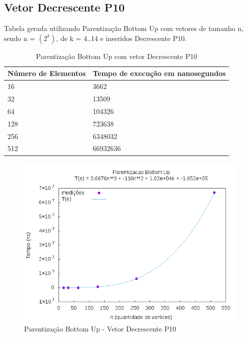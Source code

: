 \documentclass[12pt,a4paper,twoside]{report}
\begin{document}
\subsection{Vetor Decrescente P10}
Tabela gerada utilizando Parentização Bottom Up com vetores de tamanho n, sendo n = $(2^k)$, de k = 4..14 e inseridos Decrescente P10.
\begin{table}[H]
\centering
\caption{Parentização Bottom Up com vetor Decrescente P10}
\label{my-label}
\begin{tabular}{|l|l|}
\hline
\multicolumn{1}{|c|}{\textbf{Número de Elementos}} & \multicolumn{1}{c|}{\textbf{Tempo de execução em nanosegundos}} \\ \hline
16 & 3662 \\ \hline
32 & 13509 \\ \hline
64 & 104326 \\ \hline
128 & 723638 \\ \hline
256 & 6348032 \\ \hline
512 & 66932636 \\ \hline

\end{tabular}
\end{table}

\begin{figure}[H]
    \centering
    \includegraphics[width=0.7\linewidth]{graficos/Parentizacao BottomUp/Decrescente P10/ParentizacaoBottomUp.png}
  \caption{Parentização Bottom Up - Vetor Decrescente P10}
\end{figure}
\end{document}
